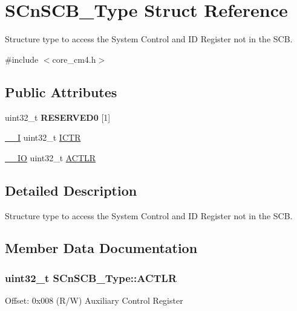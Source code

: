 \hypertarget{struct_s_cn_s_c_b___type}{}\section{S\+Cn\+S\+C\+B\+\_\+\+Type Struct Reference}
\label{struct_s_cn_s_c_b___type}


Structure type to access the System Control and ID Register not in the S\+CB.  




{\ttfamily \#include $<$core\+\_\+cm4.\+h$>$}

\subsection*{Public Attributes}
\begin{DoxyCompactItemize}
\item 
uint32\+\_\+t {\bfseries R\+E\+S\+E\+R\+V\+E\+D0} \mbox{[}1\mbox{]}\hypertarget{struct_s_cn_s_c_b___type_afe1d5fd2966d5062716613b05c8d0ae1}{}\label{struct_s_cn_s_c_b___type_afe1d5fd2966d5062716613b05c8d0ae1}

\item 
\hyperlink{core__cm4_8h_af63697ed9952cc71e1225efe205f6cd3}{\+\_\+\+\_\+I} uint32\+\_\+t \hyperlink{struct_s_cn_s_c_b___type_ad99a25f5d4c163d9005ca607c24f6a98}{I\+C\+TR}
\item 
\hyperlink{core__cm4_8h_aec43007d9998a0a0e01faede4133d6be}{\+\_\+\+\_\+\+IO} uint32\+\_\+t \hyperlink{struct_s_cn_s_c_b___type_aacadedade30422fed705e8dfc8e6cd8d}{A\+C\+T\+LR}
\end{DoxyCompactItemize}


\subsection{Detailed Description}
Structure type to access the System Control and ID Register not in the S\+CB. 

\subsection{Member Data Documentation}
\subsubsection[{\texorpdfstring{A\+C\+T\+LR}{ACTLR}}]{ uint32\+\_\+t S\+Cn\+S\+C\+B\+\_\+\+Type\+::\+A\+C\+T\+LR}\hypertarget{struct_s_cn_s_c_b___type_aacadedade30422fed705e8dfc8e6cd8d}{}\label{struct_s_cn_s_c_b___type_aacadedade30422fed705e8dfc8e6cd8d}
Offset\+: 0x008 (R/W) Auxiliary Control Register 
